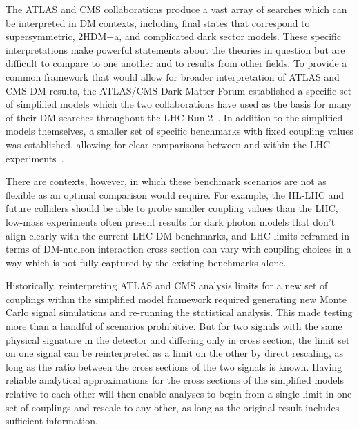 \documentclass[a4paper, 11pt]{article}
\begin{document}
The ATLAS and CMS collaborations produce a vast array of searches which can be interpreted in DM contexts, including final states that correspond to supersymmetric, 2HDM+a, and complicated dark sector models. These specific interpretations make powerful statements about the theories in question but are difficult to compare to one another and to results from other fields. To provide a common framework that would allow for broader interpretation of ATLAS and CMS DM results, the ATLAS/CMS Dark Matter Forum established a specific set of simplified models which the two collaborations have used as the basis for many of their DM searches throughout the LHC Run 2~\cite{ABERCROMBIE2020100371}. In addition to the simplified models themselves, a smaller set of specific benchmarks with fixed coupling values was established, allowing for clear comparisons between and within the LHC experiments~\cite{BOVEIA2020100365,ALBERT2019100377,ATL-PHYS-PUB-2020-021,CMSSummary}.

There are contexts, however, in which these benchmark scenarios are not as flexible as an optimal comparison would require. For example, the HL-LHC and future colliders should be able to probe smaller coupling values than the LHC, low-mass experiments often present results for dark photon models that don't align clearly with the current LHC DM benchmarks, and LHC limits reframed in terms of DM-nucleon interaction cross section can vary with coupling choices in a way which is not fully captured by the existing benchmarks alone.

Historically, reinterpreting ATLAS and CMS analysis limits for a new set of couplings within the simplified model framework required generating new Monte Carlo signal simulations and re-running the statistical analysis. This made testing more than a handful of scenarios prohibitive. But for two signals with the same physical signature in the detector and differing only in cross section, the limit set on one signal can be reinterpreted as a limit on the other by direct rescaling, as long as the ratio between the cross sections of the two signals is known. Having reliable analytical approximations for the cross sections of the simplified models relative to each other will then enable analyses to begin from a single limit in one set of couplings and rescale to any other, as long as the original result includes sufficient information. 
\end{document}
